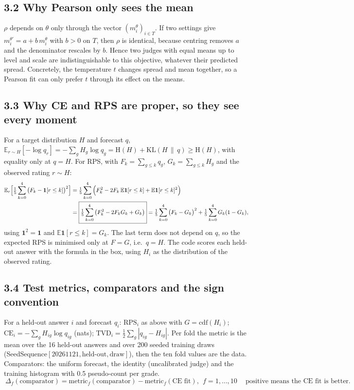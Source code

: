 \documentclass[10pt]{article}
\newcommand{\E}{\mathbb{E}}
\newcommand{\RPS}{\mathrm{RPS}}
\newcommand{\CE}{\mathrm{CE}}
\newcommand{\TVD}{\mathrm{TVD}}
\begin{document}
\subsection*{3.2 Why Pearson only sees the mean}
$\rho$ depends on $\theta$ only through the vector $(m^\theta_i)_{i\in T}$. If two settings give $m^{\theta'}_i=a+b\,m^\theta_i$ with $b>0$ on $T$, then $\rho$ is identical, because centring removes $a$ and the denominator rescales by $b$. Hence two judges with equal means up to level and scale are indistinguishable to this objective, whatever their predicted spread. Concretely, the temperature $t$ changes spread and mean together, so a Pearson fit can only prefer $t$ through its effect on the means.

\subsection*{3.3 Why CE and RPS are proper, so they see every moment}
For a target distribution $H$ and forecast $q$, $\E_{r\sim H}[-\log q_r]=-\sum_g H_g\log q_g=\mathrm{H}(H)+\mathrm{KL}(H\,\|\,q)\ge \mathrm{H}(H)$, with equality only at $q=H$. For RPS, with $F_k=\sum_{g\le k}q_g$, $G_k=\sum_{g\le k}H_g$ and the observed rating $r\sim H$:
\begin{align}
\E_r\Big[\tfrac15\sum_{k=0}^{4}\big(F_k-\mathbf 1[r\le k]\big)^2\Big]
&=\tfrac15\sum_{k=0}^{4}\Big(F_k^2-2F_k\,\E\mathbf 1[r\le k]+\E\mathbf 1[r\le k]^2\Big)\notag\\
&=\boxed{\tfrac15\sum_{k=0}^{4}\big(F_k^2-2F_kG_k+G_k\big)}=\tfrac15\sum_{k=0}^4\big(F_k-G_k\big)^2+\tfrac15\sum_{k=0}^4 G_k(1-G_k),
\end{align}
using $\mathbf 1^2=\mathbf 1$ and $\E\mathbf 1[r\le k]=G_k$. The last term does not depend on $q$, so the expected RPS is minimised only at $F=G$, i.e.\ $q=H$. The code scores each held-out answer with the formula in the box, using $H_i$ as the distribution of the observed rating.

\subsection*{3.4 Test metrics, comparators and the sign convention}
For a held-out answer $i$ and forecast $q_i$: $\RPS_i$ as above with $G=\mathrm{cdf}(H_i)$; $\CE_i=-\sum_g H_{ig}\log q_{ig}$ (nats); $\TVD_i=\tfrac12\sum_g|q_{ig}-H_{ig}|$. Per fold the metric is the mean over the 16 held-out answers and over 200 seeded training draws (SeedSequence$[20261121,\text{held-out},\text{draw}]$), then the ten fold values are the data. Comparators: the uniform forecast, the identity (uncalibrated judge) and the training histogram with 0.5 pseudo-count per grade.
\[
\boxed{\ \Delta_f(\text{comparator})=\text{metric}_f(\text{comparator})-\text{metric}_f(\text{CE fit}),\ \ f=1,\dots,10\ }\quad\text{positive means the CE fit is better.}
\]
\end{document}
